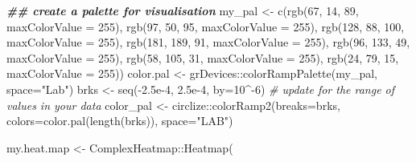 \documentclass[
]{article}
\newenvironment{Shaded}{\begin{snugshade}}{\end{snugshade}}
\newcommand{\AttributeTok}[1]{\textcolor[rgb]{0.77,0.63,0.00}{#1}}
\newcommand{\CommentTok}[1]{\textcolor[rgb]{0.56,0.35,0.01}{\textit{#1}}}
\newcommand{\DecValTok}[1]{\textcolor[rgb]{0.00,0.00,0.81}{#1}}
\newcommand{\DocumentationTok}[1]{\textcolor[rgb]{0.56,0.35,0.01}{\textbf{\textit{#1}}}}
\newcommand{\FloatTok}[1]{\textcolor[rgb]{0.00,0.00,0.81}{#1}}
\newcommand{\FunctionTok}[1]{\textcolor[rgb]{0.00,0.00,0.00}{#1}}
\newcommand{\NormalTok}[1]{#1}
\newcommand{\OtherTok}[1]{\textcolor[rgb]{0.56,0.35,0.01}{#1}}
\newcommand{\SpecialCharTok}[1]{\textcolor[rgb]{0.00,0.00,0.00}{#1}}
\newcommand{\StringTok}[1]{\textcolor[rgb]{0.31,0.60,0.02}{#1}}
\begin{document}
\begin{Shaded}
\begin{Highlighting}[]

\DocumentationTok{\#\# create a palette for visualisation}
\NormalTok{my\_pal }\OtherTok{\textless{}{-}} \FunctionTok{c}\NormalTok{(}\FunctionTok{rgb}\NormalTok{(}\DecValTok{67}\NormalTok{, }\DecValTok{14}\NormalTok{, }\DecValTok{89}\NormalTok{, }\AttributeTok{maxColorValue =} \DecValTok{255}\NormalTok{),}
            \FunctionTok{rgb}\NormalTok{(}\DecValTok{97}\NormalTok{, }\DecValTok{50}\NormalTok{, }\DecValTok{95}\NormalTok{, }\AttributeTok{maxColorValue =} \DecValTok{255}\NormalTok{),}
            \FunctionTok{rgb}\NormalTok{(}\DecValTok{128}\NormalTok{, }\DecValTok{88}\NormalTok{, }\DecValTok{100}\NormalTok{, }\AttributeTok{maxColorValue =} \DecValTok{255}\NormalTok{),}
            \FunctionTok{rgb}\NormalTok{(}\DecValTok{181}\NormalTok{, }\DecValTok{189}\NormalTok{, }\DecValTok{91}\NormalTok{, }\AttributeTok{maxColorValue =} \DecValTok{255}\NormalTok{),}
            \FunctionTok{rgb}\NormalTok{(}\DecValTok{96}\NormalTok{, }\DecValTok{133}\NormalTok{, }\DecValTok{49}\NormalTok{, }\AttributeTok{maxColorValue =} \DecValTok{255}\NormalTok{),}
            \FunctionTok{rgb}\NormalTok{(}\DecValTok{58}\NormalTok{, }\DecValTok{105}\NormalTok{, }\DecValTok{31}\NormalTok{, }\AttributeTok{maxColorValue =} \DecValTok{255}\NormalTok{),}
            \FunctionTok{rgb}\NormalTok{(}\DecValTok{24}\NormalTok{, }\DecValTok{79}\NormalTok{, }\DecValTok{15}\NormalTok{, }\AttributeTok{maxColorValue =} \DecValTok{255}\NormalTok{))}
\NormalTok{color.pal }\OtherTok{\textless{}{-}}\NormalTok{ grDevices}\SpecialCharTok{::}\FunctionTok{colorRampPalette}\NormalTok{(my\_pal, }\AttributeTok{space=}\StringTok{"Lab"}\NormalTok{)}
\NormalTok{brks }\OtherTok{\textless{}{-}} \FunctionTok{seq}\NormalTok{(}\SpecialCharTok{{-}}\FloatTok{2.5e{-}4}\NormalTok{, }\FloatTok{2.5e{-}4}\NormalTok{, }\AttributeTok{by=}\DecValTok{10}\SpecialCharTok{\^{}{-}}\DecValTok{6}\NormalTok{) }\CommentTok{\# update for the range of values in your data}
\NormalTok{color\_pal }\OtherTok{\textless{}{-}}\NormalTok{ circlize}\SpecialCharTok{::}\FunctionTok{colorRamp2}\NormalTok{(}\AttributeTok{breaks=}\NormalTok{brks, }\AttributeTok{colors=}\FunctionTok{color.pal}\NormalTok{(}\FunctionTok{length}\NormalTok{(brks)), }\AttributeTok{space=}\StringTok{"LAB"}\NormalTok{)}


\NormalTok{my.heat.map }\OtherTok{\textless{}{-}}\NormalTok{ ComplexHeatmap}\SpecialCharTok{::}\FunctionTok{Heatmap}\NormalTok{(}


\end{Highlighting}
\end{Shaded}
\end{document}
